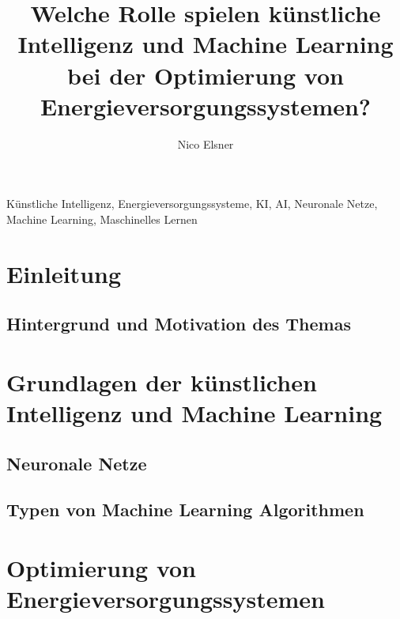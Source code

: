 \documentclass[conference]{IEEEtran}
\title{Welche Rolle spielen künstliche Intelligenz und Machine Learning bei der Optimierung von Energieversorgungssystemen?}
\begin{document}

\maketitle
\author{{\Large Nico Elsner}}

\begin{abstract}
	
\end{abstract}

\begin{IEEEkeywords}
	Künstliche Intelligenz, Energieversorgungssysteme, KI, AI, Neuronale Netze, Machine Learning, Maschinelles Lernen
\end{IEEEkeywords}

\section{Einleitung}
\subsection{Hintergrund und Motivation des Themas}


\section{Grundlagen der künstlichen Intelligenz und Machine Learning}

\subsection{Neuronale Netze}

\subsection{Typen von Machine Learning Algorithmen}


\section{Optimierung von Energieversorgungssystemen}

\end{document}
